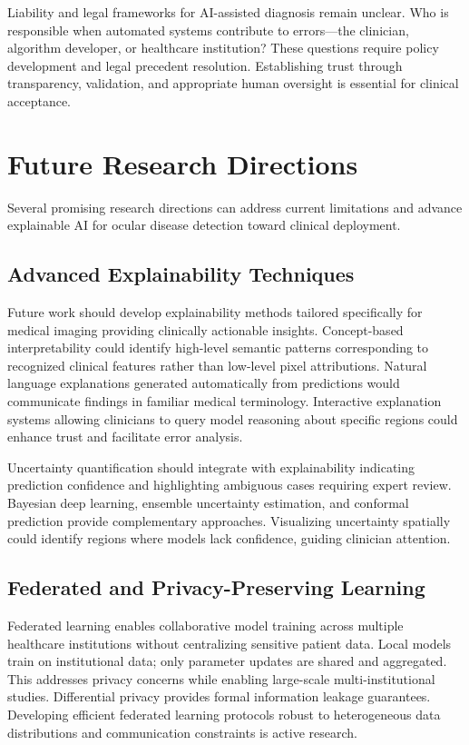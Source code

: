 Liability and legal frameworks for AI-assisted diagnosis remain unclear. Who is responsible when automated systems contribute to errors—the clinician, algorithm developer, or healthcare institution? These questions require policy development and legal precedent resolution. Establishing trust through transparency, validation, and appropriate human oversight is essential for clinical acceptance.

\section{Future Research Directions}
\label{sec:future}

Several promising research directions can address current limitations and advance explainable AI for ocular disease detection toward clinical deployment.

\subsection{Advanced Explainability Techniques}

Future work should develop explainability methods tailored specifically for medical imaging providing clinically actionable insights. Concept-based interpretability could identify high-level semantic patterns corresponding to recognized clinical features rather than low-level pixel attributions. Natural language explanations generated automatically from predictions would communicate findings in familiar medical terminology. Interactive explanation systems allowing clinicians to query model reasoning about specific regions could enhance trust and facilitate error analysis.

Uncertainty quantification should integrate with explainability indicating prediction confidence and highlighting ambiguous cases requiring expert review. Bayesian deep learning, ensemble uncertainty estimation, and conformal prediction provide complementary approaches. Visualizing uncertainty spatially could identify regions where models lack confidence, guiding clinician attention.

\subsection{Federated and Privacy-Preserving Learning}

Federated learning enables collaborative model training across multiple healthcare institutions without centralizing sensitive patient data. Local models train on institutional data; only parameter updates are shared and aggregated. This addresses privacy concerns while enabling large-scale multi-institutional studies. Differential privacy provides formal information leakage guarantees. Developing efficient federated learning protocols robust to heterogeneous data distributions and communication constraints is active research.

